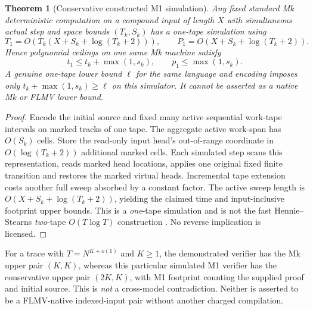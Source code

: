 \documentclass[11pt]{article}
\newtheorem{theorem}{Theorem}
\begin{document}
\begin{theorem}[Conservative constructed M1 simulation]\label{th:sim}
Any fixed standard Mk deterministic computation on a compound
input of length $X$ with simultaneous actual step and space bounds
$(T_k,S_k)$ has a one-tape simulation using
\[
 T_1=O(T_k(X+S_k+\log(T_k+2))),\qquad
 P_1=O(X+S_k+\log(T_k+2)).
\tag{2}
\]
Hence polynomial ceilings on \emph{one same Mk machine} satisfy
\[
 t_1\le t_k+\max(1,s_k),\qquad
 p_1\le \max(1,s_k).
\tag{3}
\]
A genuine one-tape lower bound $\ell$ for the same language and
encoding imposes only $t_k+\max(1,s_k)\ge\ell$ on this simulator.
It cannot be asserted as a native Mk or FLMV lower bound.
\end{theorem}
\begin{proof}
Encode the initial source and fixed many active sequential work-tape
intervals on marked tracks of one tape. The aggregate active
work-span has $O(S_k)$ cells. Store the read-only input head's
out-of-range coordinate in $O(\log(T_k+2))$ additional marked cells.
Each simulated step scans this representation, reads marked head
locations, applies one original fixed finite transition and restores
the marked virtual heads. Incremental tape extension costs another
full sweep absorbed by a constant factor. The active sweep length is
$O(X+S_k+\log(T_k+2))$, yielding the claimed time and input-inclusive
footprint upper bounds. This is a \emph{one}-tape simulation and is
not the fast Hennie--Stearns \emph{two}-tape $O(T\log T)$ construction
\cite{hs}. No reverse implication is licensed.
\end{proof}

For a trace with $T=N^{K+o(1)}$ and $K\ge1$, the demonstrated verifier
has the Mk upper pair $(K,K)$, whereas this particular simulated M1
verifier has the conservative upper pair $(2K,K)$, with M1 footprint
counting the supplied proof and initial source. This is \emph{not}
a cross-model contradiction. Neither is asserted to be a
FLMV-native indexed-input pair without another charged compilation.
\end{document}
